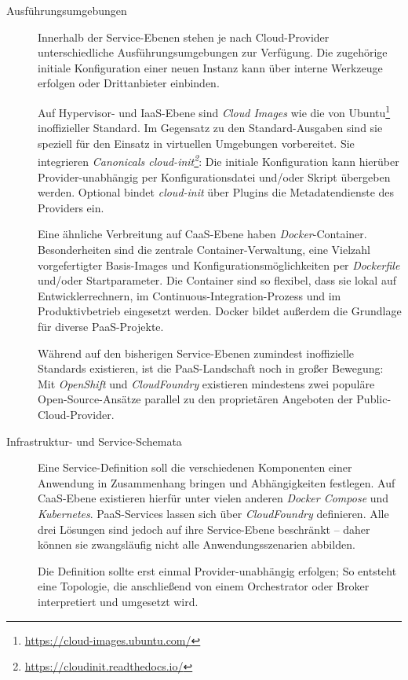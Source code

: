 \begin{description}
	
	\item[Ausführungsumgebungen] Innerhalb der Service-Ebenen stehen je nach Cloud-Provider unterschiedliche Ausführungsumgebungen zur Verfügung. Die zugehörige initiale Konfiguration einer neuen Instanz kann über interne Werkzeuge erfolgen oder Drittanbieter einbinden.
	
	Auf Hypervisor- und IaaS-Ebene sind \emph{Cloud Images} wie die von Ubuntu\footnote{\url{https://cloud-images.ubuntu.com/}} inoffizieller Standard. Im Gegensatz zu den Standard-Ausgaben sind sie speziell für den Einsatz in virtuellen Umgebungen vorbereitet. Sie integrieren \emph{Canonicals cloud-init\footnote{\url{https://cloudinit.readthedocs.io/}}}: Die initiale Konfiguration kann hierüber Provider-unabhängig per Konfigurationsdatei und/oder Skript übergeben werden. Optional bindet \emph{cloud-init} über Plugins die Metadatendienste des Providers ein.
	
	Eine ähnliche Verbreitung auf CaaS-Ebene haben \emph{Docker}-Container. Besonderheiten sind die zentrale Container-Verwaltung, eine Vielzahl vorgefertigter Basis-Images und Konfigurationsmöglichkeiten per \emph{Dockerfile} und/oder Startparameter. Die Container sind so flexibel, dass sie lokal auf Entwicklerrechnern, im Continuous-Integration-Prozess und im Produktivbetrieb eingesetzt werden. Docker bildet außerdem die Grundlage für diverse PaaS-Projekte.
	
	Während auf den bisherigen Service-Ebenen zumindest inoffizielle Standards existieren, ist die PaaS-Landschaft noch in großer Bewegung: Mit \emph{Open\-Shift} und \emph{Cloud\-Foundry} existieren mindestens zwei populäre Open-Source-Ansätze parallel zu den proprietären Angeboten der Public-Cloud-Provider.
	
	\item[Infrastruktur- und Service-Schemata] Eine Service-Definition soll die verschiedenen Komponenten einer Anwendung in Zusammenhang bringen und Abhängigkeiten festlegen. Auf CaaS-Ebene existieren hierfür unter vielen anderen \emph{Docker Compose} und \emph{Kubernetes}. PaaS-Services lassen sich über \emph{CloudFoundry} definieren. Alle drei Lösungen sind jedoch auf ihre Service-Ebene beschränkt -- daher können sie zwangsläufig nicht alle Anwendungsszenarien abbilden.
	
	Die Definition sollte erst einmal Provider-unabhängig erfolgen; So entsteht eine Topologie, die anschließend von einem Orchestrator oder Broker interpretiert und umgesetzt wird.
	

\end{description}
